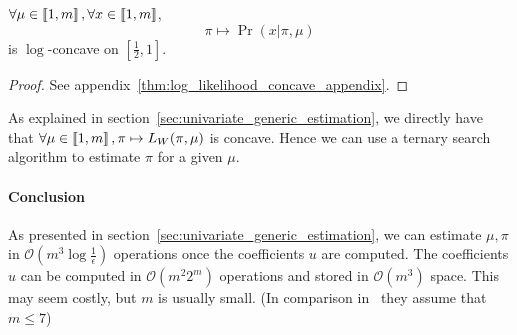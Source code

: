 \begin{conjecture}
    \label{thm:log_likelihood_concave}
    $\forall \mu \in \left\llbracket1, m\right\rrbracket,\forall x \in \left\llbracket1, m\right\rrbracket$, 
    \[ \pi \mapsto \Pr(x|\pi, \mu) \]
    is $\log$-concave on $[\frac{1}{2}, 1]$.
\end{conjecture}
\begin{proof}
    See appendix~\ref{thm:log_likelihood_concave_appendix}.
\end{proof}

As explained in section~\ref{sec:univariate_generic_estimation}, we directly have that $\forall \mu \in \left\llbracket1, m\right\rrbracket, \pi \mapsto L_W(\pi, \mu)$ is concave. Hence we can use a ternary search algorithm to estimate $\pi$ for a given $\mu$.

\paragraph{Conclusion}

As presented in section~\ref{sec:univariate_generic_estimation}, we can estimate $\mu, \pi$ in $\mathcal O(m^3 \log \frac{1}{\epsilon})$ operations once the coefficients $u$ are computed. The coefficients $u$ can be computed in $\mathcal O(m^2 2^m)$ operations and stored in $\mathcal O(m^3)$ space. This may seem costly, but $m$ is usually small. (In comparison in~\cite{biernacki2016model} they assume that $m \leq 7$)
